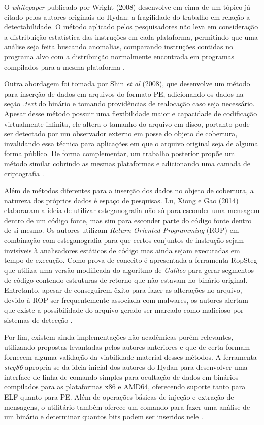 O \textit{whitepaper} publicado por Wright (2008) desenvolve em cima de um tópico já citado pelos autores originais do Hydan: a fragilidade do trabalho em relação a detectabilidade. O método aplicado pelos pesquisadores não leva em consideração a distribuição estatística das instruções em cada plataforma, permitindo que uma análise seja feita buscando anomalias, comparando instruções contidas no programa alvo com a distribuição normalmente encontrada em programas compilados para a mesma plataforma \cite{Wright2020DetectingHS}.

Outra abordagem foi tomada por Shin \textit{et al} (2008), que desenvolve um método para inserção de dados em arquivos do formato PE, adicionando os dados na seção \textit{.text} do binário e tomando providências de realocação caso seja necessário. Apesar desse método possuir uma flexibilidade maior e capacidade de codificação virtualmente infinita, ele altera o tamanho do arquivo em disco, portanto pode ser detectado por um observador externo em posse do objeto de cobertura, invalidando essa técnica para aplicações em que o arquivo original seja de alguma forma público. De forma complementar, um trabalho posterior propõe um método similar cobrindo as mesmas plataformas e adicionando uma camada de criptografia \cite{zaidan}.

Além de métodos diferentes para a inserção dos dados no objeto de cobertura, a natureza dos próprios dados é espaço de pesquisas. Lu, Xiong e Gao (2014) elaboraram a ideia de utilizar esteganografia não só para esconder uma mensagem dentro de um código fonte, mas sim para esconder parte do código fonte dentro de si mesmo. Os autores utilizam \textit{Return Oriented Programming} (ROP) em combinação com esteganografia para que certos conjuntos de instrução sejam invisíveis à analisadores estáticos de código mas ainda sejam executadas em tempo de execução. Como prova de conceito é apresentada a ferramenta RopSteg que utiliza uma versão modificada do algoritmo de \textit{Galileo} para gerar segmentos de código contendo estruturas de retorno que não estavam no binário original. Entretanto, apesar de conseguirem êxito para fazer as alterações no arquivo, devido à ROP ser frequentemente associada com malwares, os autores alertam que existe a possibilidade do arquivo gerado ser marcado como malicioso por sistemas de detecção \cite{ropsteg}.

Por fim, existem ainda implementações não acadêmicas porém relevantes, utilizando propostas levantadas pelos autores anteriores e que de certa formam fornecem alguma validação da viabilidade material desses métodos. A ferramenta \textit{steg86} apropria-se da ideia inicial dos autores do Hydan para desenvolver uma interface de linha de comando simples para ocultação de dados em binários compilados para as plataformas x86 e AMD64, oferecendo suporte tanto para ELF quanto para PE. Além de operações básicas de injeção e extração de mensagens, o utilitário também oferece um comando para fazer uma análise de um binário e determinar quantos bits podem ser inseridos nele \cite{steg86}.